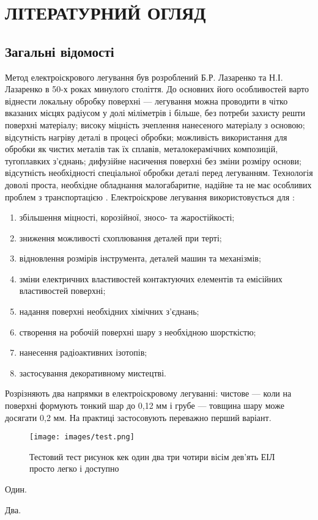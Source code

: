 \chapter{ЛІТЕРАТУРНИЙ ОГЛЯД}
\section{Загальні відомості}
Метод електроіскрового легування був розроблений Б.Р. Лазаренко та Н.І. Лазаренко в 50-х роках минулого століття. До основних його особливостей варто віднести локальну обробку поверхні — легування  можна проводити в чітко вказаних місцях радіусом у долі міліметрів і більше, без потреби захисту решти поверхні матеріалу; високу міцність зчеплення нанесеного матеріалу з основою; відсутність нагріву деталі в процесі обробки; можливість використання для обробки як чистих металів так їх сплавів, металокерамічних композицій, тугоплавких з'єднань; дифузійне насичення поверхні без зміни розміру основи; відсутність необхідності спеціальної обробки деталі перед легуванням. Технологія доволі проста, необхідне обладнання малогабаритне, надійне та не має особливих проблем з транспортацією \cite{hitlevich-1985}.
Електроіскрове легування використовується для \cite{hiltevich-1985}: %

\begin{enumerate}
\item збільшення міцності, корозійної, зносо- та жаростійкості;
\item зниження можливості схоплювання деталей при терті;
\item відновлення розмірів інструмента, деталей машин та механізмів;
\item зміни електричних властивостей контактуючих елементів та емісійних властивостей поверхні;
\item надання поверхні необхідних хімічних з'єднань;
\item створення на робочій поверхні шару з необхідною шорсткістю;
\item нанесення радіоактивних ізотопів;
\item застосування декоративному мистецтві. 
\end{enumerate}
Розрізняють два напрямки в електроіскровому легуванні: чистове — коли на поверхні формують тонкий шар до 0,12 мм і грубе — товщина шару може досягати 0,2 мм. На практиці застосовують переважно перший варіант.

\begin{figure}[h!]
  \centering
  \texttt{[image: images/test.png]}
  \caption{Тестовий тест рисунок кек один два три чотири вісім дев'ять ЕІЛ просто легко і доступно\label{fig:label} }
\end{figure}

Один.

Два.
